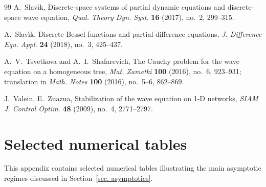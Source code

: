 \documentclass[12pt]{amsart}
\numberwithin{equation}{section}
\theoremstyle{boldremark}
\begin{document}
\begin{thebibliography}{99}
 A.~Slav\'{\i}k, Discrete-space systems of partial dynamic equations and discrete-space wave equation, \emph{Qual. Theory Dyn. Syst.} \textbf{16} (2017), no.~2, 299--315.

 A.~Slav\'{\i}k, Discrete Bessel functions and partial difference equations, \emph{J. Difference Equ. Appl.} \textbf{24} (2018), no.~3, 425--437.

 A.~V.~Tsvetkova and A.~I.~Shafarevich, The Cauchy problem for the wave equation on a homogeneous tree, \emph{Mat. Zametki} \textbf{100} (2016), no.~6, 923--931; translation in \emph{Math. Notes} \textbf{100} (2016), no.~5--6, 862--869.

 J.~Valein, E.~Zuazua, Stabilization of the wave equation on 1-D networks, \emph{SIAM J. Control Optim.} \textbf{48} (2009), no.~4, 2771--2797.
\end{thebibliography}

\clearpage

\appendix

\section{Selected numerical tables}\label{app:selected-tables}

\setcounter{table}{0}
\renewcommand{\thetable}{A.\arabic{table}}

This appendix contains selected numerical tables illustrating the main asymptotic regimes discussed in Section~\ref{sec. asymptotics}.
\end{document}
